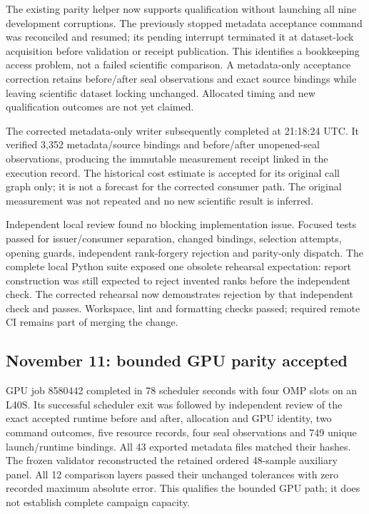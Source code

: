The existing parity helper now supports qualification without launching all
nine development corruptions. The previously stopped metadata acceptance command
was reconciled and resumed; its pending interrupt terminated it at dataset-lock
acquisition before validation or receipt publication. This identifies a
bookkeeping access problem, not a failed scientific comparison. A metadata-only
acceptance correction retains before/after seal observations and exact source
bindings while leaving scientific dataset locking unchanged. Allocated timing
and new qualification outcomes are not yet claimed.

The corrected metadata-only writer subsequently completed at 21:18:24 UTC.
It verified 3,352 metadata/source bindings and before/after unopened-seal
observations, producing the immutable measurement receipt linked in the
execution record. The historical cost estimate is accepted for its original
call graph only; it is not a forecast for the corrected consumer path. The
original measurement was not repeated and no new scientific result is inferred.

Independent local review found no blocking implementation issue. Focused tests
passed for issuer/consumer separation, changed bindings, selection attempts,
opening guards, independent rank-forgery rejection and parity-only dispatch.
The complete local Python suite exposed one obsolete rehearsal expectation:
report construction was still expected to reject invented ranks before the
independent check. The corrected rehearsal now demonstrates rejection by that
independent check and passes. Workspace, lint and formatting checks passed;
required remote CI remains part of merging the change.

\subsection*{November 11: bounded GPU parity accepted}

GPU job 8580442 completed in 78 scheduler seconds with four OMP slots on an
L40S. Its successful scheduler exit was followed by independent review of the
exact accepted runtime before and after, allocation and GPU identity, two
command outcomes, five resource records, four seal observations and 749 unique
launch/runtime bindings. All 43 exported metadata files matched their hashes.
The frozen validator reconstructed the retained ordered 48-sample auxiliary
panel. All 12 comparison layers passed their unchanged tolerances with zero
recorded maximum absolute error. This qualifies the bounded GPU path; it does
not establish complete campaign capacity.

